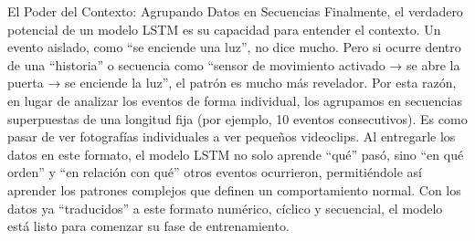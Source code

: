 \begin{enumerate}
\begin{enumerate}
                        El Poder del Contexto: Agrupando Datos en Secuencias
                        Finalmente, el verdadero potencial de un modelo LSTM es su capacidad para entender el contexto. Un evento aislado, como ``se enciende una luz'', no dice mucho. Pero si ocurre dentro de una ``historia'' o secuencia como ``sensor de movimiento activado → se abre la puerta → se enciende la luz'', el patrón es mucho más revelador.
                        Por esta razón, en lugar de analizar los eventos de forma individual, los agrupamos en secuencias superpuestas de una longitud fija (por ejemplo, 10 eventos consecutivos). Es como pasar de ver fotografías individuales a ver pequeños videoclips.
                        Al entregarle los datos en este formato, el modelo LSTM no solo aprende ``qué'' pasó, sino ``en qué orden'' y ``en relación con qué'' otros eventos ocurrieron, permitiéndole así aprender los patrones complejos que definen un comportamiento normal. Con los datos ya ``traducidos'' a este formato numérico, cíclico y secuencial, el modelo está listo para comenzar su fase de entrenamiento.


\end{enumerate}
\end{enumerate}
